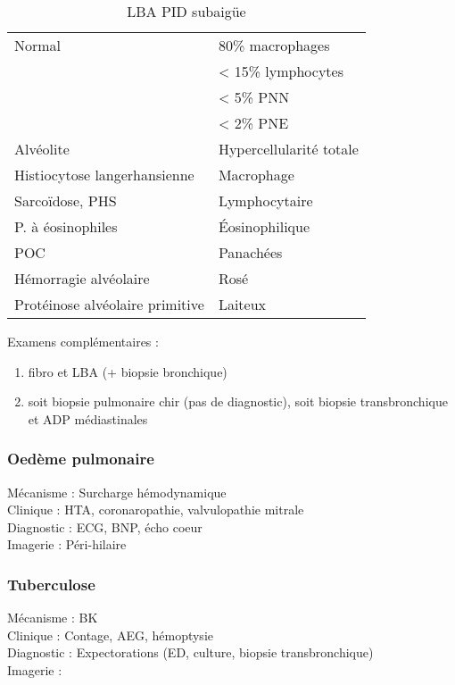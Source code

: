 \documentclass{book}
\begin{document}
\begin{table}[htbp]
  \caption{LBA PID subaigüe}
  \centering
  \begin{tabular}{ll}
    \toprule
    Normal & 80\% macrophages\\
           & < 15\% lymphocytes\\
           & < 5\% PNN\\
           & < 2\% PNE\\
    \midrule
    Alvéolite & Hypercellularité totale\\
    Histiocytose langerhansienne & Macrophage\\
    Sarcoïdose, PHS & Lymphocytaire\\
    P. à éosinophiles & Éosinophilique\\
    \gls{POC} & Panachées\\
    Hémorragie alvéolaire & Rosé\\
    Protéinose alvéolaire primitive & Laiteux\\
    \bottomrule
  \end{tabular}
\end{table}

Examens complémentaires :
\begin{enumerate}
\item fibro et LBA (+ biopsie bronchique)
\item soit biopsie pulmonaire chir (pas de diagnostic), soit biopsie
transbronchique et ADP médiastinales
\end{enumerate}

\subsubsection{Oedème pulmonaire}
\label{sec:org7799e38}
Mécanisme : Surcharge hémodynamique\\
Clinique : HTA, coronaropathie, valvulopathie mitrale\\
Diagnostic : ECG, BNP, écho coeur\\
Imagerie : Péri-hilaire

\subsubsection{Tuberculose}
\label{sec:orge208402}
Mécanisme : BK\\
Clinique : Contage, AEG, hémoptysie\\
Diagnostic : Expectorations (ED, culture, biopsie transbronchique)\\
Imagerie : 
\end{document}
